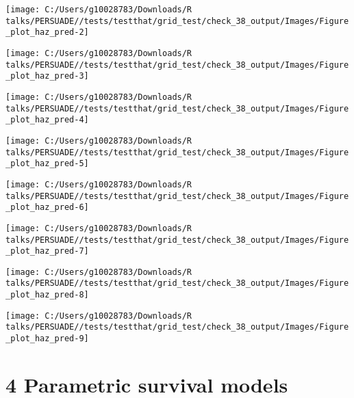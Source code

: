 \documentclass[
]{article}
\begin{document}
\begin{flushleft}\texttt{[image: C:/Users/g10028783/Downloads/R talks/PERSUADE//tests/testthat/grid\_test/check\_38\_output/Images/Figure\_plot\_haz\_pred-2]} \end{flushleft}

\begin{flushleft}\texttt{[image: C:/Users/g10028783/Downloads/R talks/PERSUADE//tests/testthat/grid\_test/check\_38\_output/Images/Figure\_plot\_haz\_pred-3]} \end{flushleft}

\begin{flushleft}\texttt{[image: C:/Users/g10028783/Downloads/R talks/PERSUADE//tests/testthat/grid\_test/check\_38\_output/Images/Figure\_plot\_haz\_pred-4]} \end{flushleft}

\begin{flushleft}\texttt{[image: C:/Users/g10028783/Downloads/R talks/PERSUADE//tests/testthat/grid\_test/check\_38\_output/Images/Figure\_plot\_haz\_pred-5]} \end{flushleft}

\begin{flushleft}\texttt{[image: C:/Users/g10028783/Downloads/R talks/PERSUADE//tests/testthat/grid\_test/check\_38\_output/Images/Figure\_plot\_haz\_pred-6]} \end{flushleft}

\begin{flushleft}\texttt{[image: C:/Users/g10028783/Downloads/R talks/PERSUADE//tests/testthat/grid\_test/check\_38\_output/Images/Figure\_plot\_haz\_pred-7]} \end{flushleft}

\begin{flushleft}\texttt{[image: C:/Users/g10028783/Downloads/R talks/PERSUADE//tests/testthat/grid\_test/check\_38\_output/Images/Figure\_plot\_haz\_pred-8]} \end{flushleft}

\begin{flushleft}\texttt{[image: C:/Users/g10028783/Downloads/R talks/PERSUADE//tests/testthat/grid\_test/check\_38\_output/Images/Figure\_plot\_haz\_pred-9]} \end{flushleft}

\clearpage

\section{4 Parametric survival models}\label{parametric-survival-models}
\end{document}
